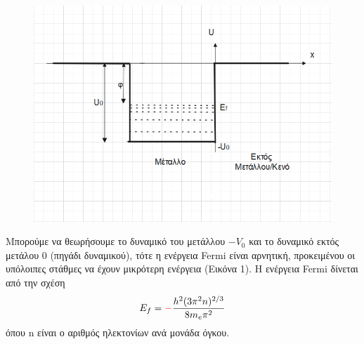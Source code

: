 \documentclass[a4paper]{article}
\begin{document}



\begin{figure}
\includegraphics[width=1.0\linewidth]{metal.png} 
\caption{ }
\label{fig:wrapfig}
\end{figure}
Μπορούμε να θεωρήσουμε το δυναμικό του μετάλλου $-V_0$ και το δυναμικό εκτός μετάλου $0$ (πηγάδι δυναμικού), τότε η ενέργεια Fermi είναι αρνητική, προκειμένου οι υπόλοιπες στάθμες να έχουν 
μικρότερη ενέργεια 
(Εικόνα 1).
 Η ενέργεια Fermi δίνεται από την σχέση 
 \begin{equation}\label{1}
 	E_f =\textcolor{red}{-} \frac{h^2(3\pi^2 n)^{2/3}}{8m_e\pi^2}
 \end{equation}
όπου n είναι ο αριθμός ηλεκτονίων ανά μονάδα όγκου.
\end{document}
